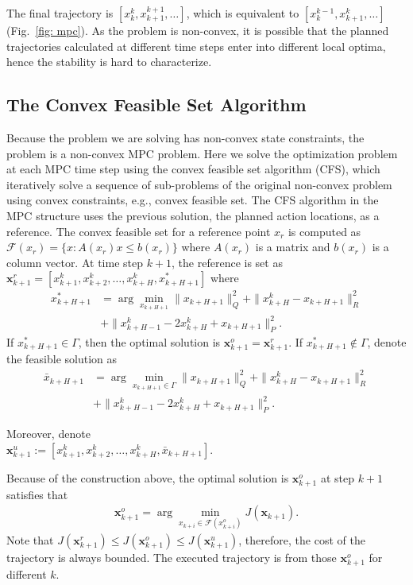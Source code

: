 \documentclass[letterpaper, 10 pt, conference]{ieeeconf}  %
\begin{document}
The final trajectory is $[x_k^k,x_{k+1}^{k+1},\ldots]$, which is equivalent to $[x_{k}^{k-1},x_{k+1}^{k},\ldots]$ (Fig.~\ref{fig: mpc}). As the problem is non-convex, it is possible that the planned trajectories calculated at different time steps enter into different local optima, hence the stability is hard to characterize. 




\subsection{The Convex Feasible Set Algorithm}
Because the problem we are solving has non-convex state constraints, the problem is a non-convex MPC problem. Here we solve the optimization problem at each MPC time step using the convex feasible set algorithm (CFS), which iteratively solve a sequence of sub-problems of the original non-convex problem using convex constraints, e.g., convex feasible set. The CFS algorithm in the MPC structure uses the previous solution, the planned action locations, as a reference. The convex feasible set for a reference point $x_r$ is computed as $\mathcal{F}(x_r) = \{x:A(x_r)x\leq b(x_r)\}$ where $A(x_r)$ is a matrix and $b(x_r)$ is a column vector. 
At time step $k+1$, the reference is set as $\mathbf{x}_{k+1}^{r}=[x_{k+1}^{k},x_{k+2}^{k},\ldots,x_{k+H}^k, x_{k+H+1}^*]$ where
\begin{equation}
\begin{split}
x_{k+H+1}^* & = \arg\min_{x_{k+H+1}} \|x_{k+H+1}\|_Q^2+\|x_{k+H}^k-x_{k+H+1}\|_R^2 \\
 & +\|x_{k+H-1}^k -2x_{k+H}^k+x_{k+H+1}\|_P^2\text{.}
\end{split}
\end{equation}
If $x_{k+H+1}^*\in\Gamma$, then the optimal solution is $\mathbf{x}_{k+1}^o = \mathbf{x}_{k+1}^r$.  If $x_{k+H+1}^*\notin\Gamma$, denote the feasible solution as 
\begin{equation}
\begin{split}
\bar{x}_{k+H+1} & = \arg\min_{x_{k+H+1}\in\Gamma} \|x_{k+H+1}\|_Q^2+\|x_{k+H}^k-x_{k+H+1}\|_R^2 \\
 & +\|x_{k+H-1}^k -2x_{k+H}^k+x_{k+H+1}\|_P^2 \text{.}
\end{split}
\end{equation}

Moreover, denote \\$\mathbf{x}_{k+1}^{u}:=[x_{k+1}^{k},x_{k+2}^{k},\ldots,x_{k+H}^k, \bar x_{k+H+1}]$. 

Because of the construction above, the optimal solution is $\mathbf{x}_{k+1}^{o}$ at step $k+1$ satisfies that
\begin{eqnarray}
\mathbf{x}_{k+1}^{o} = \arg\min_{x_{k+i}\in \mathcal{F}(x_{k+i}^o)}J(\mathbf{x}_{k+1}).
\end{eqnarray}
Note that $J(\mathbf{x}_{k+1}^{r})\leq J(\mathbf{x}_{k+1}^{o})\leq J(\mathbf{x}_{k+1}^{u})$, therefore, the cost of the trajectory is always bounded. 
The executed trajectory is from those $\mathbf{x}_{k+1}^{o}$ for different $k$.
\end{document}
